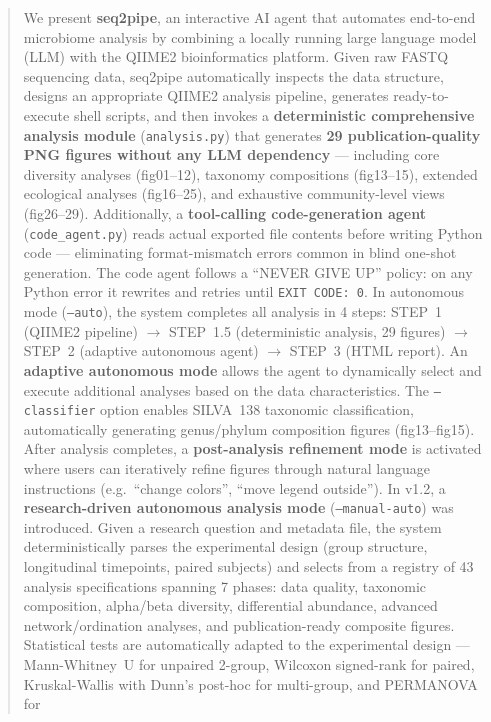 \documentclass[12pt, a4paper]{article}
\begin{document}
\begin{abstract}
We present \textbf{seq2pipe}, an interactive AI agent that automates end-to-end
microbiome analysis by combining a locally running large language model (LLM)
with the QIIME2 bioinformatics platform.
Given raw FASTQ sequencing data, seq2pipe automatically inspects
the data structure, designs an appropriate QIIME2 analysis pipeline,
generates ready-to-execute shell scripts, and then invokes a
\textbf{deterministic comprehensive analysis module} (\texttt{analysis.py})
that generates \textbf{29 publication-quality PNG figures without any LLM dependency}
--- including core diversity analyses (fig01--12), taxonomy compositions (fig13--15),
extended ecological analyses (fig16--25), and exhaustive community-level views (fig26--29).
Additionally, a \textbf{tool-calling code-generation agent} (\texttt{code\_agent.py})
reads actual exported file contents before writing Python code ---
eliminating format-mismatch errors common in blind one-shot generation.
The code agent follows a ``NEVER GIVE UP'' policy: on any Python error
it rewrites and retries until \texttt{EXIT CODE: 0}.
In autonomous mode (\texttt{--auto}), the system completes all analysis in 4 steps:
STEP~1 (QIIME2 pipeline) $\to$ STEP~1.5 (deterministic analysis, 29 figures) $\to$
STEP~2 (adaptive autonomous agent) $\to$ STEP~3 (HTML report).
An \textbf{adaptive autonomous mode} allows the agent to dynamically select
and execute additional analyses based on the data characteristics.
The \texttt{--classifier} option enables SILVA~138 taxonomic classification,
automatically generating genus/phylum composition figures (fig13--fig15).
After analysis completes, a \textbf{post-analysis refinement mode} is activated
where users can iteratively refine figures through natural language instructions
(e.g.\ ``change colors'', ``move legend outside'').
In v1.2, a \textbf{research-driven autonomous analysis mode} (\texttt{--manual-auto})
was introduced. Given a research question and metadata file, the system
deterministically parses the experimental design (group structure, longitudinal timepoints,
paired subjects) and selects from a registry of 43 analysis specifications
spanning 7 phases: data quality, taxonomic composition, alpha/beta diversity,
differential abundance, advanced network/ordination analyses, and publication-ready
composite figures. Statistical tests are automatically adapted to the experimental
design --- Mann-Whitney~U for unpaired 2-group, Wilcoxon signed-rank for paired,
Kruskal-Wallis with Dunn's post-hoc for multi-group, and PERMANOVA for

\end{abstract}
\end{document}

